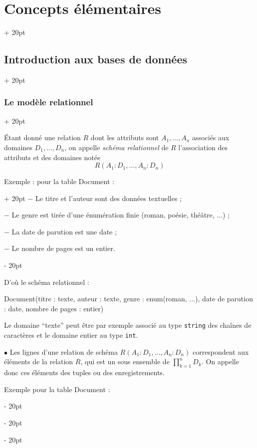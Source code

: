 \documentclass[a4paper, 12pt, twoside]{article}
\newcommand{\ind}[1][20pt]{\advance\leftskip + #1}
\newcommand{\deind}[1][20pt]{\advance\leftskip - #1}
\newenvironment{indt}[2][20pt]{#2 \par \ind[#1]}{\par \deind} %
\begin{document}
\begin{indt}{\section{Concepts élémentaires}}
\begin{indt}{\subsection{Introduction aux bases de données}}
\begin{indt}{\subsubsection{Le modèle relationnel}}
                \vspace{6pt}
                
                \'Etant donné une relation $R$ dont les attributs sont $A_1, \ldots, A_n$ associés aux domaines $D_1, \ldots, D_n$, on appelle \textit{schéma relationnel} de $R$ l'association des attributs et des domaines notée
                    \[ R(A_1 : D_1, \ldots, A_n : D_n) \]
                
                \begin{indt}{Exemple : pour la table Document :}
                    $-$ Le titre et l'auteur sont des données textuelles ;
                    
                    $-$ Le genre est tirée d'une énumération finie (roman, poésie, théâtre, ...) ;
                    
                    $-$ La date de parution est une date ;
                    
                    $-$ Le nombre de pages est un entier.
                \end{indt}
                
                \vspace{6pt}
                
                D'où le schéma relationnel :
                
                Document(titre : texte, auteur : texte, genre : enum(roman, ...), date de parution : date, nombre de pages : entier)
                
                \vspace{6pt}
                
                Le domaine ``texte'' peut être par exemple associé au type \texttt{string} des chaînes de caractères et le domaine entier au type \texttt{int}.
                
                \vspace{12pt}
                
                $\bullet$ Les lignes d'une relation de schéma $R(A_1 : D_1, \ldots, A_n : D_n)$ correspondent aux éléments de la relation $R$, qui est un sous ensemble de $\displaystyle \prod_{k = 1}^n D_k$. On appelle donc ces éléments des tuples ou des enregistrements.
                
                \vspace{6pt}
                
                Exemple pour la table Document :
                

\end{indt}
\end{indt}
\end{indt}
\end{document}
